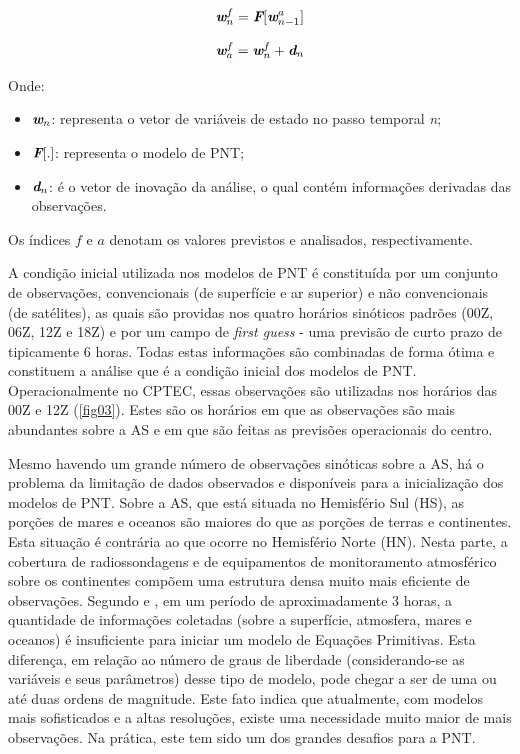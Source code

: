\begin{equation}
\textit{\textbf{w}}^{f}_{n}=\textit{\textbf{F}}[\textit{\textbf{w}}^{a}_{n-1}]
\label{form04}
\end{equation}

\begin{equation}
\textit{\textbf{w}}^{f}_{a}=\textit{\textbf{w}}^{f}_{n}+\textit{\textbf{d}}_{n}
\label{form05}
\end{equation}

Onde:

\begin{itemize}
\item $\textit{\textbf{w}}_{n}$: representa o vetor de variáveis de estado no passo temporal \textit{n};
\item $\textit{\textbf{F}}[.]$: representa o modelo de PNT;
\item $\textit{\textbf{d}}_{n}$: é o vetor de inovação da análise, o qual contém informações derivadas das observações.
\end{itemize}

Os índices $\textit{f}$ e $\textit{a}$ denotam os valores previstos e analisados, respectivamente.

A condição inicial utilizada nos modelos de PNT é constituída por um conjunto de observações, convencionais (de superfície e ar superior) e não convencionais (de satélites), as quais são providas nos quatro horários sinóticos padrões (00Z, 06Z, 12Z e 18Z) e por um campo de \textit{first guess} - uma previsão de curto prazo de tipicamente 6 horas. Todas estas informações são combinadas de forma ótima e constituem a análise que é a condição inicial dos modelos de PNT. Operacionalmente no CPTEC, essas observações são utilizadas nos horários das 00Z e 12Z (\autoref{fig03}). Estes são os horários em que as observações são mais abundantes sobre a AS e em que são feitas as previsões operacionais do centro. 

Mesmo havendo um grande número de observações sinóticas sobre a AS, há o problema da limitação de dados observados e disponíveis para a inicialização dos modelos de PNT. Sobre a AS, que está situada no Hemisfério Sul (HS), as porções de mares e oceanos são maiores do que as porções de terras e continentes. Esta situação é contrária ao que ocorre no Hemisfério Norte (HN). Nesta parte, a cobertura de radiossondagens e de equipamentos de monitoramento atmosférico sobre os continentes compõem uma estrutura densa muito mais eficiente de observações. Segundo \cite{morel80} e \cite{kalnay03}, em um período de aproximadamente 3 horas, a quantidade de informações coletadas (sobre a superfície, atmosfera, mares e oceanos) é insuficiente para iniciar um modelo de Equações Primitivas. Esta diferença, em relação ao número de graus de liberdade (considerando-se as variáveis e seus parâmetros) desse tipo de modelo, pode chegar a ser de uma ou até duas ordens de magnitude. Este fato indica que atualmente, com modelos mais sofisticados e a altas resoluções, existe uma necessidade muito maior de mais observações. Na prática, este tem sido um dos grandes desafios para a PNT. 


